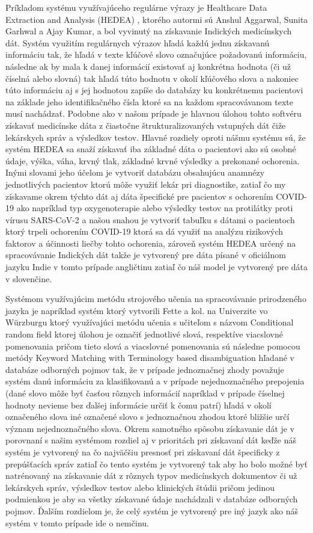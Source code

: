 Príkladom systému využívajúceho regulárne výrazy je Healthcare Data Extraction and Analysis (HEDEA) \cite{hedea}, ktorého
autormi sú Anshul Aggarwal, Sunita Garhwal a Ajay Kumar, 
a bol vyvinutý na získavanie Indických medicínskych dát.
Systém využitím regulárnych výrazov hľadá každú jednu
získavanú informáciu tak, že hľadá v texte kľúčové slovo
označujúce požadovanú informáciu, následne ak by mala 
k danej informácií existovať aj konkrétna hodnota
(či už číselná alebo slovná) tak hľadá túto hodnotu v okolí
kľúčového slova a nakoniec túto informáciu aj 
s jej hodnotou zapíše do databázy ku konkrétnemu 
pacientovi na základe jeho identifikačného
čísla ktoré sa na každom spracovávanom texte musí nachádzať. 
Podobne ako v našom prípade je hlavnou úlohou tohto 
softvéru získavať medicínske dáta z čiastočne štrukturalizovaných
vstupných dát čiže lekárskych správ a výsledkov testov.
Hlavné rozdiely oproti nášmu systému sú, že systém HEDEA
sa snaží získavať iba základné dáta o pacientovi ako sú osobné
údaje, výška, váha, krvný tlak, základné krvné výsledky a 
prekonané ochorenia. Inými slovami jeho účelom je vytvoriť
databázu obsahujúcu anamnézy jednotlivých pacientov
ktorú môže využiť lekár pri diagnostike,
zatiaľ čo my získavame okrem týchto dát aj dáta 
špecifické pre pacientov s ochorením COVID-19 ako
napríklad typ oxygenoterapie alebo výsledky testov
na protilátky proti vírusu SARS-CoV-2 a našou snahou je 
vytvoriť tabuľku s dátami o pacientoch ktorý trpeli ochorením COVID-19 ktorá
sa dá využiť na analýzu rizikových faktorov a účinnosti liečby
tohto ochorenia, zároveň systém HEDEA určený na 
spracovávanie Indických dát
takže je vytvorený pre dáta písané v oficiálnom jazyku
Indie v tomto prípade angličtinu zatiaľ čo náš model
je vytvorený pre dáta v slovenčine.

Systémom využívajúcim metódu strojového učenia na
spracovávanie prirodzeného jazyka je napríklad 
systém ktorý vytvorili Fette a kol. na Univerzite
vo Würzburgu \cite{infExtGer} ktorý využívajúci metódu učenia s 
učiteľom s názvom Conditional random field ktorej úlohou
je označiť jednotlivé slová, respektíve viacslovné
pomenovania \cite{CRF} pričom tieto slová a viacslovné pomenovania sú následne pomocou metódy 
Keyword Matching with Terminology based disambiguation
hľadané v databáze
odborných pojmov tak, že v prípade jednoznačnej zhody 
považuje systém danú informáciu za klasifikovanú a v
prípade nejednoznačného prepojenia (dané slovo môže byť časťou
rôznych informácií napríklad v prípade číselnej hodnoty nevieme
bez ďalšej informácie určiť k čomu patrí) hľadá v okolí označeného 
slova iné označené slovo s jednoznačnou zhodou ktoré bližšie 
určí význam nejednoznačného slova. Okrem samotného spôsobu
získavanie dát je v porovnaní s našim systémom rozdiel 
aj v prioritách pri získavaní dát keďže náš systém 
je vytvorený na čo najväčšiu presnosť pri získavaní
dát špecificky z prepúšťacích správ zatiaľ čo tento 
systém je vytvorený tak aby ho bolo možné byť natrénovaný na 
získavanie dát z rôznych typov medicínskych dokumentov či už
lekárskych správ, výsledkov testov alebo klinických 
štúdii pričom jedinou podmienkou je aby sa všetky získavané údaje 
nachádzali v databáze odborných pojmov. Ďalším rozdielom je, 
že celý systém je vytvorený 
pre iný jazyk ako náš systém v tomto prípade ide o 
nemčinu. 

